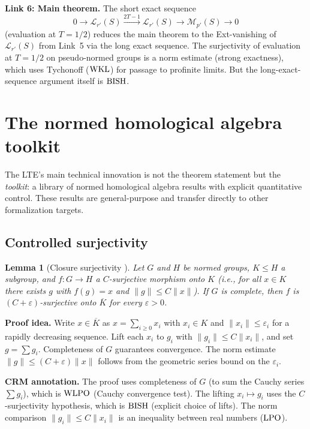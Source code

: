 \documentclass[11pt,a4paper]{article}
\theoremstyle{plain}
\newtheorem{lemma}[theorem]{Lemma}
\theoremstyle{definition}
\newcommand{\BISH}{\textup{BISH}}
\newcommand{\WKL}{\textup{WKL}}
\newcommand{\WLPO}{\textup{WLPO}}
\newcommand{\LPO}{\textup{LPO}}
\begin{document}
\medskip
\noindent\textbf{Link 6: Main theorem.}
The short exact sequence
\[
  0 \longrightarrow \mathcal{L}_{r'}(S) \xrightarrow{2T-1}
  \mathcal{L}_{r'}(S) \longrightarrow
  \mathcal{M}_{p'}(S) \longrightarrow 0
\]
(evaluation at $T = 1/2$) reduces the main theorem to the Ext-vanishing
of $\mathcal{L}_{r'}(S)$ from Link~5 via the long exact sequence.
The surjectivity of evaluation at $T = 1/2$ on pseudo-normed groups
is a norm estimate (strong exactness), which uses
Tychonoff ($\WKL$) for passage to profinite limits.  But the
long-exact-sequence argument itself is $\BISH$.


\section{The normed homological algebra toolkit}\label{sec:toolkit}

The LTE's main technical innovation is not the theorem statement
but the \emph{toolkit}: a library of normed homological algebra
results with explicit quantitative control.  These results are
general-purpose and transfer directly to other formalization targets.

\subsection{Controlled surjectivity}

\begin{lemma}[Closure surjectivity {\cite{Commelin2022}}]
\label{lem:closure-surj}
Let $G$ and $H$ be normed groups, $K \leq H$ a subgroup, and
$f: G \to H$ a $C$-surjective morphism onto $K$ (i.e., for all
$x \in K$ there exists $g$ with $f(g) = x$ and
$\|g\| \leq C\|x\|$).  If $G$ is complete, then $f$ is
$(C+\varepsilon)$-surjective onto $\overline{K}$ for every
$\varepsilon > 0$.
\end{lemma}

\noindent\textbf{Proof idea.}
Write $x \in \overline{K}$ as $x = \sum_{i \geq 0} x_i$ with
$x_i \in K$ and $\|x_i\| \leq \varepsilon_i$ for a rapidly
decreasing sequence.  Lift each $x_i$ to $g_i$ with
$\|g_i\| \leq C\|x_i\|$, and set $g = \sum g_i$.  Completeness
of $G$ guarantees convergence.  The norm estimate
$\|g\| \leq (C+\varepsilon)\|x\|$ follows from the geometric
series bound on the $\varepsilon_i$.

\medskip
\noindent\textbf{CRM annotation.}
The proof uses completeness of $G$ (to sum the Cauchy series
$\sum g_i$), which is $\WLPO$ (Cauchy convergence test).  The
lifting $x_i \mapsto g_i$ uses the $C$-surjectivity hypothesis,
which is $\BISH$ (explicit choice of lifts).  The norm comparison
$\|g_i\| \leq C\|x_i\|$ is an inequality between real numbers
($\LPO$).
\end{document}

